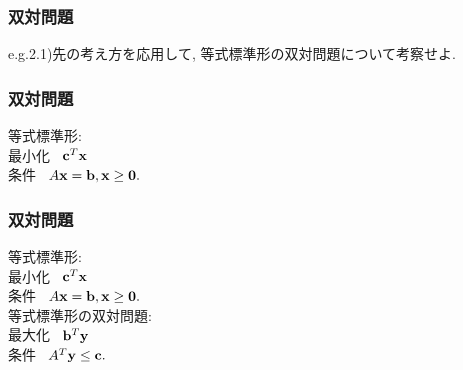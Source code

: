 \documentclass[unicode, 12pt, aspectratio = 43]{beamer}
\begin{document}
\begin{frame}[fragile]
	\frametitle{双対問題}
	e.g.2.1)先の考え方を応用して, 等式標準形の双対問題について考察せよ.
\end{frame}

\begin{frame}[fragile]
	\frametitle{双対問題}
	等式標準形: \\
	最小化 \ ${\bf c}^T {\bf x}$ \\
	条件 \ $A{\bf x} = {\bf b}, {\bf x} \ge {\bf 0}.$
\end{frame}

\begin{frame}[fragile]
	\frametitle{双対問題}
	等式標準形: \\
	最小化 \ ${\bf c}^T {\bf x}$ \\
	条件 \ $A{\bf x} = {\bf b}, {\bf x} \ge {\bf 0}.$ \\ \vspace{1em}
	等式標準形の双対問題: \\
	最大化 \ ${\bf b}^T {\bf y}$ \\
	条件 \ $A^T{\bf y} \le {\bf c}.$
\end{frame}

\end{document}
